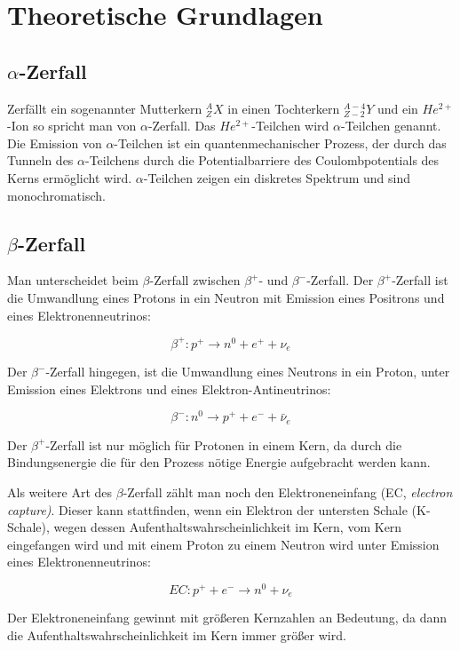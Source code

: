 \section{Theoretische Grundlagen}


\subsection{$\alpha$-Zerfall}

Zerfällt ein sogenannter Mutterkern $_Z^AX$ in einen Tochterkern $_{Z-2}^{A-4}Y$ und ein $He^{2+}$-Ion so spricht man von $\alpha$-Zerfall. Das $He^{2+}$-Teilchen wird $\alpha$-Teilchen genannt. Die Emission von $\alpha$-Teilchen ist ein quantenmechanischer Prozess, der durch das Tunneln des $\alpha$-Teilchens durch die Potentialbarriere des Coulombpotentials des Kerns ermöglicht wird. $\alpha$-Teilchen zeigen ein diskretes Spektrum und sind monochromatisch.

\subsection{$\beta$-Zerfall}

Man unterscheidet beim $\beta$-Zerfall zwischen $\beta^+$- und $\beta^-$-Zerfall. Der $\beta^+$-Zerfall ist die Umwandlung eines Protons in ein Neutron mit Emission eines Positrons und eines Elektronenneutrinos:

$$ \beta^+: p^+ \rightarrow n^0 + e^+ + \nu_e $$

Der $\beta^-$-Zerfall hingegen, ist die Umwandlung eines Neutrons in ein Proton, unter Emission eines Elektrons und eines Elektron-Antineutrinos:

$$ \beta^-: n^0 \rightarrow p^+ + e^- + \bar \nu_e $$

Der $\beta^+$-Zerfall ist nur möglich für Protonen in einem Kern, da durch die Bindungsenergie die für den Prozess nötige Energie aufgebracht werden kann.

Als weitere Art des $\beta$-Zerfall zählt man noch den Elektroneneinfang (EC, \emph{electron capture)}. Dieser kann stattfinden, wenn ein Elektron der untersten Schale (K-Schale), wegen dessen Aufenthaltswahrscheinlichkeit im Kern, vom Kern eingefangen wird und mit einem Proton zu einem Neutron wird unter Emission eines Elektronenneutrinos:

$$ EC: p^+ + e^- \rightarrow n^0 + \nu_e $$

Der Elektroneneinfang gewinnt mit größeren Kernzahlen an Bedeutung, da dann die Aufenthaltswahrscheinlichkeit im Kern immer größer wird.

